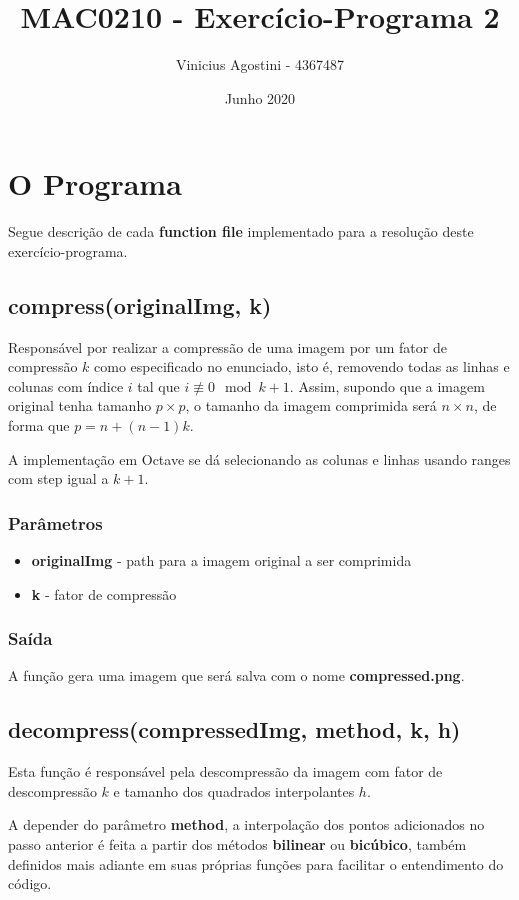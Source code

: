 \documentclass[leqno]{article}
\title{MAC0210 - Exercício-Programa 2}
\author{Vinicius Agostini - 4367487}
\date{Junho 2020}
\begin{document}
\maketitle

\section{O Programa}
Segue descrição de cada \textbf{function file} implementado para a
resolução deste exercício-programa.

\subsection{compress(originalImg, k)}
Responsável por realizar a compressão de uma imagem por um fator de compressão
$k$ como especificado no enunciado, isto é, removendo todas as linhas e colunas
com índice $i$ tal que $i \not\equiv 0 \mod k+1$. Assim, supondo que a imagem
original tenha tamanho $p \times p$, o tamanho da imagem comprimida será
$n \times n$, de forma que $p = n + (n-1)k$.

A implementação em Octave se dá selecionando as colunas e linhas usando ranges
com step igual a $k+1$.

\subsubsection{Parâmetros}
\begin{itemize}
    \item \textbf{originalImg} - path para a imagem original a ser comprimida
    \item \textbf{k} - fator de compressão
\end{itemize}

\subsubsection{Saída}
A função gera uma imagem que será salva com o nome \textbf{compressed.png}.

\subsection{decompress(compressedImg, method, k, h)}
Esta função é responsável pela descompressão da imagem com fator de descompressão
$k$ e tamanho dos quadrados interpolantes $h$.

A depender do parâmetro \textbf{method}, a interpolação dos pontos
adicionados no passo anterior é feita a partir dos métodos \textbf{bilinear} ou
\textbf{bicúbico}, também definidos mais adiante em suas próprias funções para
facilitar o entendimento do código.
\end{document}
